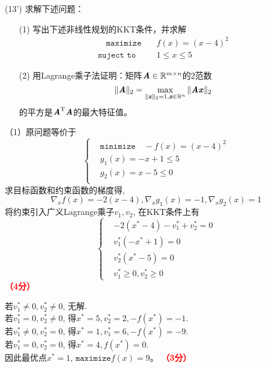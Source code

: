\documentclass[12pt,a4paper,openany,twoside]{ctexbook}
\begin{document}
\begin{exercise}(13')
	求解下述问题：
	\begin{itemize}
		\item[(1)] 写出下述非线性规划的KKT条件，并求解
		\begin{align*}
			\quad \texttt{maximize} \quad & f(x)=(x-4)^2 \\
			\texttt{suject to} \quad & 1\leq x \leq 5 
		\end{align*}
		\item [(2)] 用Lagrange乘子法证明：矩阵$ \boldsymbol{\mathit{A}}\in\mathbb{R}^{m\times n} $的2范数 \[ \Vert\boldsymbol{\mathit{A}}\Vert_{2}=\max_{\Vert\boldsymbol{\mathit{x}}\Vert_2=1,\boldsymbol{\mathit{x}}\in\mathbb{R}^n}\Vert\boldsymbol{\mathit{A}}\boldsymbol{\mathit{x}}\Vert_{2} \] 的平方是$ \boldsymbol{\mathit{A}}^{\mathrm{T}}\boldsymbol{\mathit{A}} $的最大特征值。
	\end{itemize}
\end{exercise}
\begin{Solution}
	（1）原问题等价于
	\begin{equation*}
		\left\{
		\begin{aligned}
			& \texttt{minimize}  \quad - f(x)=(x-4)^2\\
			& g_{1}(x) = -x + 1 \leq 5\\
			& g_{2}(x) = x - 5 \leq 0 \\
		\end{aligned}
		\right.
	\end{equation*}
	求目标函数和约束函数的梯度得,
	$$\nabla_{x}f(x) = -2(x-4), \nabla_{x}g_{1}(x) = -1, \nabla_{x}g_{2}(x) = 1$$
	将约束引入广义Lagrange乘子$v_{1}, v_{2}$, 在KKT条件上有
	\begin{equation*}
		\left\{
		\begin{aligned}
			& -2(x^{*} - 4) - v_{1}^{*} + v_{2}^{*} = 0\\
			& v_{1}^{*}(-x^{*} + 1) = 0\\
			& v_{2}^{*}(x^{*} - 5) = 0 \\
			& v_{1}^{*} \geq 0, v_{2}^{*}\geq 0
		\end{aligned}
		\right.
	\end{equation*}
\hfill \textcolor{red}{\textbf{（4分）}}

	若$v_{1}^{*}\neq 0, v_{2}^{*}\neq 0$, 无解. \\
	若$v_{1}^{*} = 0, v_{2}^{*}\neq 0$, 得$x^{*} = 5, v_{2}^{*} = 2, -f(x^{*}) = -1$. \\
	若$v_{1}^{*} \neq 0, v_{2}^{*}= 0$, 得$x^{*} = 1, v_{1}^{*} = 6, -f(x^{*}) = -9$. \\
	若$v_{1}^{*} = 0, v_{2}^{*}= 0$, 得$x^{*} = 4, f(x^{*}) = 0$. \\
	因此最优点$x^{*} = 1$, $\texttt{maximize}f(x) = 9$。
	\hfill \textcolor{red}{\textbf{（3分）}}
	

\end{Solution}
\end{document}

